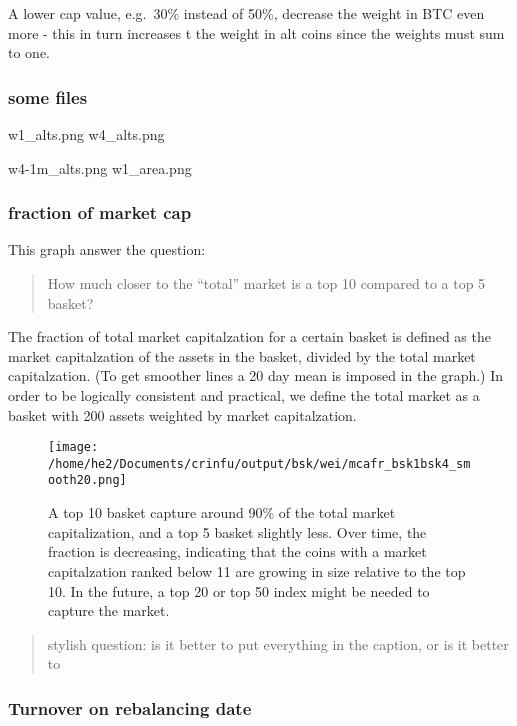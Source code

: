 \documentclass[12,]{article}
\begin{document}
A lower cap value, e.g.~30\% instead of 50\%, decrease the weight in BTC
even more - this in turn increases t the weight in alt coins since the
weights must sum to one.

\subsubsection{some files}\label{some-files}

w1\_alts.png w4\_alts.png

w4-1m\_alts.png w1\_area.png

\subsubsection{fraction of market cap}\label{fraction-of-market-cap}

This graph answer the question:

\begin{quote}
How much closer to the ``total'' market is a top 10 compared to a top 5
basket?
\end{quote}

The fraction of total market capitalzation for a certain basket is
defined as the market capitalzation of the assets in the basket, divided
by the total market capitalzation. (To get smoother lines a 20 day mean
is imposed in the graph.) In order to be logically consistent and
practical, we define the total market as a basket with 200 assets
weighted by market capitalzation.

\begin{figure}
\centering
\texttt{[image: /home/he2/Documents/crinfu/output/bsk/wei/mcafr\_bsk1bsk4\_smooth20.png]}
\caption{A top 10 basket capture around 90\% of the total market
capitalization, and a top 5 basket slightly less. Over time, the
fraction is decreasing, indicating that the coins with a market
capitalzation ranked below 11 are growing in size relative to the top
10. In the future, a top 20 or top 50 index might be needed to capture
the market.}
\end{figure}

\begin{quote}
stylish question: is it better to put everything in the caption, or is
it better to
\end{quote}

\subsubsection{Turnover on rebalancing
date}\label{turnover-on-rebalancing-date}
\end{document}
